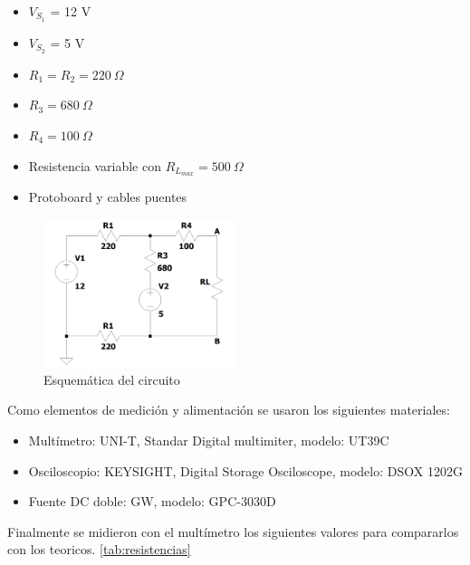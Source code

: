 \documentclass{article}
\begin{document}
            	\begin{itemize}
                \item $V_{S_{1}}$ = 12 V
                \item $V_{S_{2}}$ = 5 V
                \item $R_{1} = R_{2} = 220 ~\Omega $
                \item $R_{3} = 680~ \Omega $
                \item $R_{4} = 100~ \Omega $
                \item Resistencia variable con $R_{L_{max}} = 500~\Omega$
                \item Protoboard y cables puentes
                \end{itemize}
        
        
        
\begin{figure}[!h]
  \centering
  \includegraphics[width=0.5\textwidth]{circuitoLTSpice.png}
  \caption{Esquemática del circuito}
  \label{fig:esquemática}
\end{figure}
        
       Como elementos de medición y alimentación se usaron los siguientes materiales:\par
       
                   \begin{itemize}
                \item Multímetro: UNI-T,  Standar Digital multimiter, modelo: UT39C
                \item Osciloscopio: KEYSIGHT, Digital Storage Osciloscope, modelo: DSOX 1202G 
                \item Fuente DC doble: GW, modelo: GPC-3030D
                \end{itemize}

        Finalmente se midieron con el multímetro los siguientes valores para compararlos con los teoricos. \autoref{tab:resistencias}\par
        
\end{document}
